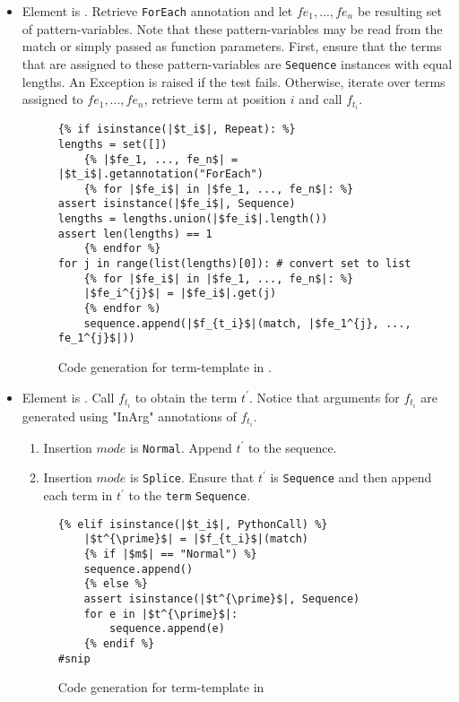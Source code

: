 \begin{itemize}
\item
Element is \TermRepeat. Retrieve \texttt{ForEach} annotation and let $fe_1, ..., fe_n$ be resulting set of pattern-variables. Note that these pattern-variables may be read from the match or simply passed as function parameters. First, ensure that the terms that are assigned to these pattern-variables are \texttt{Sequence} instances with equal lengths. An Exception is raised if the test fails. Otherwise, iterate over terms assigned to $fe_1, ..., fe_n$, retrieve term at position $i$ and call $f_{t_i}$.

\begin{figure}
\begin{verbatim}
{% if isinstance(|$t_i$|, Repeat): %}
lengths = set([])
	{% |$fe_1, ..., fe_n$| = |$t_i$|.getannotation("ForEach")
	{% for |$fe_i$| in |$fe_1, ..., fe_n$|: %}
assert isinstance(|$fe_i$|, Sequence)
lengths = lengths.union(|$fe_i$|.length())
assert len(lengths) == 1
	{% endfor %}
for j in range(list(lengths)[0]): # convert set to list
	{% for |$fe_i$| in |$fe_1, ..., fe_n$|: %}
	|$fe_i^{j}$| = |$fe_i$|.get(j)
	{% endfor %)
	sequence.append(|$f_{t_i}$|(match, |$fe_1^{j}, ..., fe_1^{j}$|))
\end{verbatim}
\caption{Code generation for term-template \RepeatNoArg \space in \TermSequenceNoArg.}
\label{codegen-term-sequence-repeat}
\end{figure}

\item
Element is \PythonCall. Call $f_{t_i}$ to obtain the term $t^{\prime}$. Notice that arguments for $f_{t_i}$ are generated using "InArg" annotations of $f_{t_i}$.
	\begin{enumerate}
	\item Insertion $mode$ is \texttt{Normal}. Append $t^{\prime}$ to the sequence.
	\item Insertion $mode$ is \texttt{Splice}. Ensure that $t^{\prime}$ is \texttt{Sequence} and then append each term in $t^{\prime}$ to the \texttt{term} \texttt{Sequence}.
	\end{enumerate}

\begin{figure}
\begin{verbatim}
{% elif isinstance(|$t_i$|, PythonCall) %}
	|$t^{\prime}$| = |$f_{t_i}$|(match)
	{% if |$m$| == "Normal") %}
	sequence.append()
	{% else %}
	assert isinstance(|$t^{\prime}$|, Sequence)
	for e in |$t^{\prime}$|:
		sequence.append(e)
	{% endif %}
#snip
\end{verbatim}
\caption{Code generation for term-template \PythonCallNoArg \space in \TermSequenceNoArg}
\label{codegen-term-sequence-pycall}
\end{figure}


\end{itemize}
